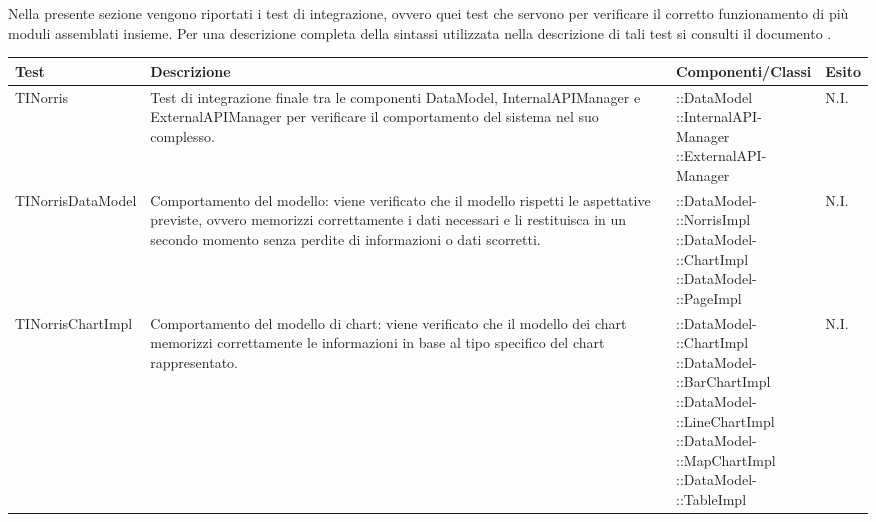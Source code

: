 	Nella presente sezione vengono riportati i test di integrazione, ovvero quei test che servono per verificare il corretto funzionamento di più moduli assemblati insieme. Per una descrizione completa della sintassi utilizzata nella descrizione di tali test si consulti il documento .

\begin{longtabu}{| X | X | X[0.9] | X[0.3] |}

			\hline
			\rowfont{\bf}
			Test &
			Descrizione &
			Componenti/Classi &
			Esito \\
			\hline \endhead




	TINorris
	&
Test di integrazione finale tra le componenti DataModel, InternalAPIManager e ExternalAPIManager per verificare il comportamento del sistema nel suo complesso.
& \parbox[t]{0.6\textwidth}{
::DataModel\\
::InternalAPI-\\Manager\\
::ExternalAPI-\\Manager}
			& N.I.
			\\ \hline



	TINorrisDataModel
	&
Comportamento del modello: viene verificato che il modello rispetti le aspettative previste, ovvero memorizzi correttamente i dati necessari e li restituisca in un secondo momento senza perdite di informazioni o dati scorretti.
& \parbox[t]{0.6\textwidth}{
::DataModel-\\::NorrisImpl\\
::DataModel-\\::ChartImpl\\
::DataModel-\\::PageImpl}
			& N.I.
			\\ \hline



	TINorrisChartImpl
	&
Comportamento del modello di chart: viene verificato che il modello dei chart memorizzi correttamente le informazioni in base al tipo specifico del chart rappresentato.
& \parbox[t]{0.6\textwidth}{
::DataModel-\\::ChartImpl\\
::DataModel-\\::BarChartImpl\\
::DataModel-\\::LineChartImpl\\
::DataModel-\\::MapChartImpl\\
::DataModel-\\::TableImpl}
			& N.I.
			\\ \hline




\end{longtabu}
